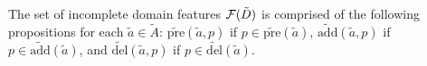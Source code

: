 \documentclass{article}
\newtheorem{definition}[theorem]{Definition}
\newenvironment{packed_itemize}{
\begin{itemize}
  \setlength{\itemsep}{1pt}
  \setlength{\parskip}{0pt}
  \setlength{\parsep}{0pt}
}{\end{itemize}}
\begin{document}
The set of incomplete domain features ${\cal F}(\tilde{D})$ is comprised of the following propositions for each $\tilde{a} \in \tilde{A}$:
 $\widetilde{\text{pre}}(\tilde{a}, p)$ if $p \in \widetilde{\text{pre}}(\tilde{a})$, $\widetilde{\text{add}}(\tilde{a}, p)$ if $p \in \widetilde{\text{add}}(\tilde{a})$, and $\widetilde{\text{del}}(\tilde{a}, p)$ if $p \in \widetilde{\text{del}}(\tilde{a})$.
%
\end{document}

